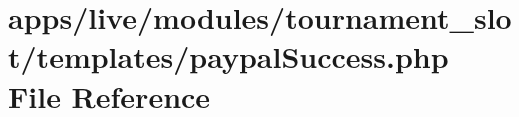 \hypertarget{live_2modules_2tournament__slot_2templates_2paypal_success_8php}{\section{apps/live/modules/tournament\-\_\-slot/templates/paypal\-Success.php File Reference}
\label{live_2modules_2tournament__slot_2templates_2paypal_success_8php}
}
